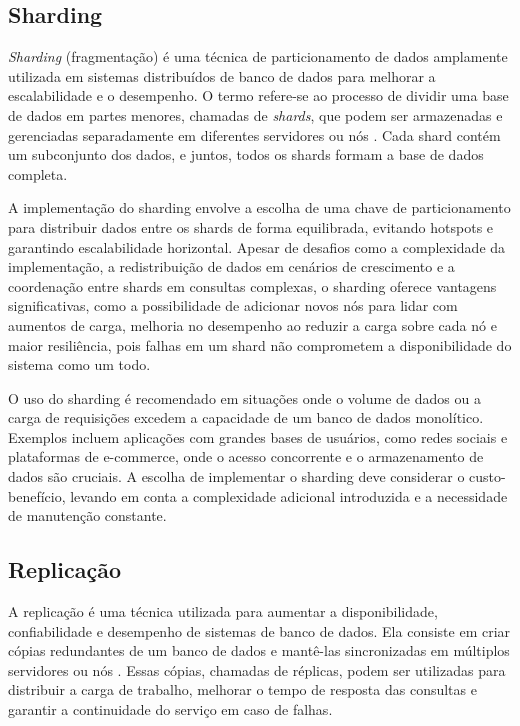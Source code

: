 \subsection{Sharding}


\emph{Sharding} (fragmentação) é uma técnica de particionamento de dados amplamente utilizada em sistemas distribuídos de banco de dados para melhorar a escalabilidade e o desempenho. O termo refere-se ao processo de dividir uma base de dados em partes menores, chamadas de \emph{shards}, que podem ser armazenadas e gerenciadas separadamente em diferentes servidores ou nós \cite{sharding-mongodb}. Cada shard contém um subconjunto dos dados, e juntos, todos os shards formam a base de dados completa.

A implementação do sharding envolve a escolha de uma chave de particionamento para distribuir dados entre os shards de forma equilibrada, evitando hotspots e garantindo escalabilidade horizontal. Apesar de desafios como a complexidade da implementação, a redistribuição de dados em cenários de crescimento e a coordenação entre shards em consultas complexas, o sharding oferece vantagens significativas, como a possibilidade de adicionar novos nós para lidar com aumentos de carga, melhoria no desempenho ao reduzir a carga sobre cada nó e maior resiliência, pois falhas em um shard não comprometem a disponibilidade do sistema como um todo.

O uso do sharding é recomendado em situações onde o volume de dados ou a carga de requisições excedem a capacidade de um banco de dados monolítico. Exemplos incluem aplicações com grandes bases de usuários, como redes sociais e plataformas de e-commerce, onde o acesso concorrente e o armazenamento de dados são cruciais. A escolha de implementar o sharding deve considerar o custo-benefício, levando em conta a complexidade adicional introduzida e a necessidade de manutenção constante.

\subsection{Replicação}

A replicação é uma técnica utilizada para aumentar a disponibilidade, confiabilidade e desempenho de sistemas de banco de dados. Ela consiste em criar cópias redundantes de um banco de dados e mantê-las sincronizadas em múltiplos servidores ou nós \cite{replication-mongodb}. Essas cópias, chamadas de réplicas, podem ser utilizadas para distribuir a carga de trabalho, melhorar o tempo de resposta das consultas e garantir a continuidade do serviço em caso de falhas.

